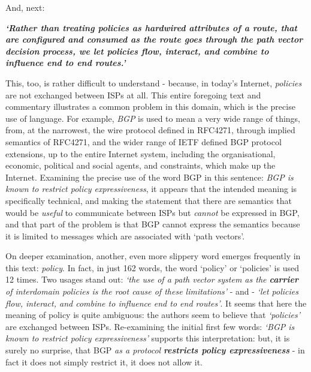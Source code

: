 \medskip
And, next:

\textbf{\textit{`Rather than treating policies as hardwired attributes of a route, that are configured and consumed as the route goes through the path vector decision process, we let policies flow, interact, and combine to influence end to end routes.'}}

This, too, is rather difficult to understand - because, in today's Internet, \textit{policies} are
not exchanged between ISPs at all. This entire foregoing text and commentary
illustrates a common problem in this  domain, which is the precise use of
language. For example, \textit{BGP} is used to mean a very wide range of
things, from, at the narrowest, the wire protocol defined in RFC4271, through
implied semantics of RFC4271, and the wider range of IETF defined BGP protocol
extensions, up to the entire Internet system, including the organisational,
economic, political and social agents, and constraints, which make up the
Internet. Examining the precise use of the word BGP in this sentence:
\textit{BGP is known to restrict policy expressiveness}, it appears that the
intended meaning is specifically technical, and making the statement that there
are semantics that would be \textit{useful} to communicate between ISPs but
\textit{cannot} be expressed in BGP, and that part of the problem is that
BGP cannot express the semantics because it is limited to messages which are
associated with `path vectors'.

On deeper examination, another, even more
slippery word emerges frequently in this text: \textit{policy}. In fact, in
just 162 words, the word `policy' or `policies' is used 12 times. Two usages
stand out: \textit{`the use of a path vector system as the \textbf{carrier} of
	interdomain policies is the root cause of these limitations'} - and -
\textit{`let policies flow, interact, and combine to influence end to end
	routes'}.
It seems that here the meaning of policy is quite ambiguous: the authors seem
to believe that \textit{`policies'} are exchanged between ISPs.
Re-examining the initial first few words:
\textit{`BGP is known to restrict policy expressiveness'}
supports this interpretation: but, it is surely no surprise, that BGP
\textit{as a protocol} \textit\textbf{restricts policy expressiveness} - in
fact it does not simply restrict it, it does not allow it.

